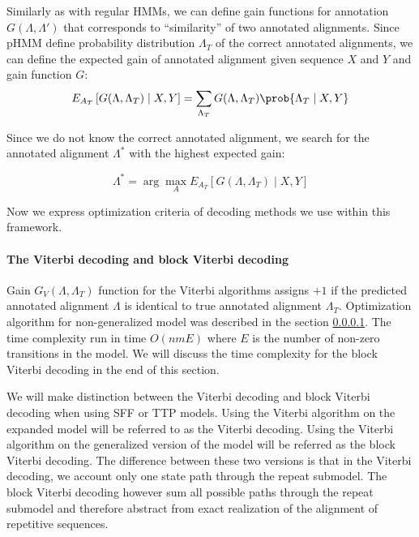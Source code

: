 Similarly as with regular HMMs, we can define gain functions for annotation
$G(\Lambda, \Lambda')$ that corresponds to ``similarity'' of two annotated
alignments.  Since pHMM define probability distribution $\Lambda_T$ of the
correct annotated alignments, we can define the expected gain of annotated
alignment given sequence $X$ and $Y$ and gain function $G$:
\begin{equation}
E_{A_T}\left[G(\Lambda, \Lambda_T)\mid X, Y\right] = 
\sum_{\Lambda_T}G(\Lambda, \Lambda_T)\prob{\Lambda_T\mid X, Y}
\end{equation}

Since we do not know the correct annotated alignment, we search for the
annotated alignment $\Lambda^*$ with the highest expected gain:

\begin{equation}
\Lambda^* = \arg\max_AE_{A_T}\left[G(\Lambda, \Lambda_T)\mid X, Y\right]
\end{equation}

Now we express optimization criteria of decoding methods we use within this
framework. 

\paragraph{The Viterbi decoding and block Viterbi decoding} Gain $G_V(\Lambda,
\Lambda_T)$ function for the Viterbi algorithms assigns $+1$ if the predicted
annotated alignment $\Lambda$ is identical to true annotated alignment
$\Lambda_T$. Optimization algorithm for non-generalized model was described in
the section \ref{}.  The time complexity run in time $O(nmE)$ where $E$ is the
number of non-zero transitions in the model.  We will discuss the time
complexity for the block Viterbi decoding in the end of this section.

We will make distinction between the Viterbi decoding and block Viterbi
decoding when using SFF or TTP models. Using the Viterbi algorithm on the
expanded model will be referred to as the Viterbi decoding. Using the Viterbi
algorithm on the generalized version of the model will be referred as the block
Viterbi decoding. The difference between these two versions is that in the
Viterbi decoding, we account only one state path through the repeat submodel.
The block Viterbi decoding however sum all possible paths through the repeat
submodel and therefore abstract from exact realization of the alignment of
repetitive sequences.


